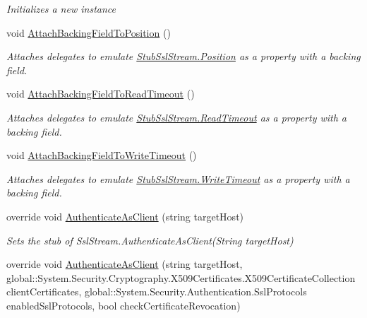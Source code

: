 \begin{DoxyCompactItemize}
\begin{DoxyCompactList}\small\item\em Initializes a new instance\end{DoxyCompactList}\item 
void \hyperlink{class_system_1_1_net_1_1_security_1_1_fakes_1_1_stub_ssl_stream_a4bc773a52820a41fe854c055b434209d}{Attach\-Backing\-Field\-To\-Position} ()
\begin{DoxyCompactList}\small\item\em Attaches delegates to emulate \hyperlink{class_system_1_1_net_1_1_security_1_1_fakes_1_1_stub_ssl_stream_a548f8461c2e82d12da560e90ac42f7d2}{Stub\-Ssl\-Stream.\-Position} as a property with a backing field.\end{DoxyCompactList}\item 
void \hyperlink{class_system_1_1_net_1_1_security_1_1_fakes_1_1_stub_ssl_stream_a88d4f3442ce1b8ea79e98f8ce739cd3e}{Attach\-Backing\-Field\-To\-Read\-Timeout} ()
\begin{DoxyCompactList}\small\item\em Attaches delegates to emulate \hyperlink{class_system_1_1_net_1_1_security_1_1_fakes_1_1_stub_ssl_stream_a74ed283ded0e55635c990554d0c6d9f4}{Stub\-Ssl\-Stream.\-Read\-Timeout} as a property with a backing field.\end{DoxyCompactList}\item 
void \hyperlink{class_system_1_1_net_1_1_security_1_1_fakes_1_1_stub_ssl_stream_a35ada0ee2901acedba59d200002e9079}{Attach\-Backing\-Field\-To\-Write\-Timeout} ()
\begin{DoxyCompactList}\small\item\em Attaches delegates to emulate \hyperlink{class_system_1_1_net_1_1_security_1_1_fakes_1_1_stub_ssl_stream_a74580e3ff628c9e673fb05ea33f8dea9}{Stub\-Ssl\-Stream.\-Write\-Timeout} as a property with a backing field.\end{DoxyCompactList}\item 
override void \hyperlink{class_system_1_1_net_1_1_security_1_1_fakes_1_1_stub_ssl_stream_a57e507086e2b15e0f219e4159ba688f8}{Authenticate\-As\-Client} (string target\-Host)
\begin{DoxyCompactList}\small\item\em Sets the stub of Ssl\-Stream.\-Authenticate\-As\-Client(\-String target\-Host)\end{DoxyCompactList}\item 
override void \hyperlink{class_system_1_1_net_1_1_security_1_1_fakes_1_1_stub_ssl_stream_a0108c0d017cbc220d3faf90566840c1b}{Authenticate\-As\-Client} (string target\-Host, global\-::\-System.\-Security.\-Cryptography.\-X509\-Certificates.\-X509\-Certificate\-Collection client\-Certificates, global\-::\-System.\-Security.\-Authentication.\-Ssl\-Protocols enabled\-Ssl\-Protocols, bool check\-Certificate\-Revocation)

\end{DoxyCompactItemize}

